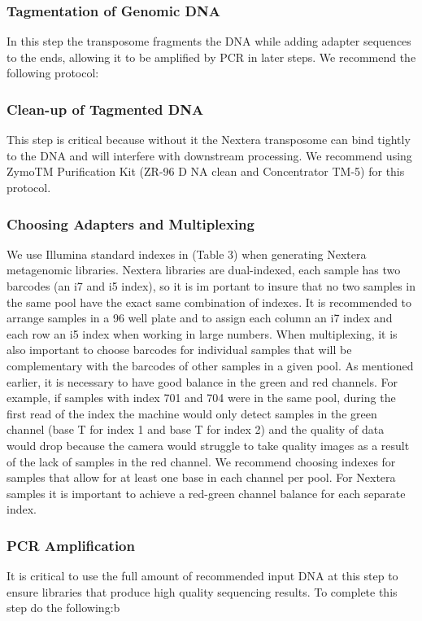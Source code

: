 \documentclass[graybox]{svmult}
\begin{document}
\subsubsection{Tagmentation of Genomic DNA}

In this step the transposome fragments the DNA while adding adapter sequences to the ends, allowing it to be amplified by PCR in later steps.
We recommend the following protocol:

\subsubsection{Clean-up of Tagmented DNA}

This step is critical because without it the Nextera transposome can bind tightly to the DNA and will interfere with downstream processing.  We recommend using ZymoTM Purification Kit (ZR-96 D NA clean and Concentrator TM-5) for this protocol. 


\subsubsection{Choosing Adapters and Multiplexing}

We use Illumina standard indexes in (Table 3) when generating Nextera metagenomic libraries. Nextera libraries are dual-indexed, each sample has two  barcodes (an i7 and i5 index), so it is im
portant to insure that no two samples in the same pool have the exact same combination of indexes. It is recommended to arrange samples in a 96 well plate and to assign each column an i7 index
 and each row an i5 index when working in large numbers. When multiplexing, it is also important to choose barcodes for individual samples that will be complementary with the barcodes of other
 samples in a given pool. As mentioned earlier, it is necessary to have good balance in the green and red channels. For example, if samples with index 701 and 704 were in the same pool, during
 the first read of the index the machine would only detect samples in the green channel (base T for index 1 and base T for index 2) and the quality of data would drop because the camera would 
struggle to take quality images as a result of the lack of samples in the red channel. We recommend choosing indexes for samples that allow for at least one base in each channel per pool. For 
Nextera samples it is important to achieve a red-green channel balance for each separate index.


\subsubsection{PCR Amplification}
It is critical to use the full amount of recommended input DNA at this step to ensure libraries that produce high quality sequencing results. To complete this step do the following:b\\
\end{document}
